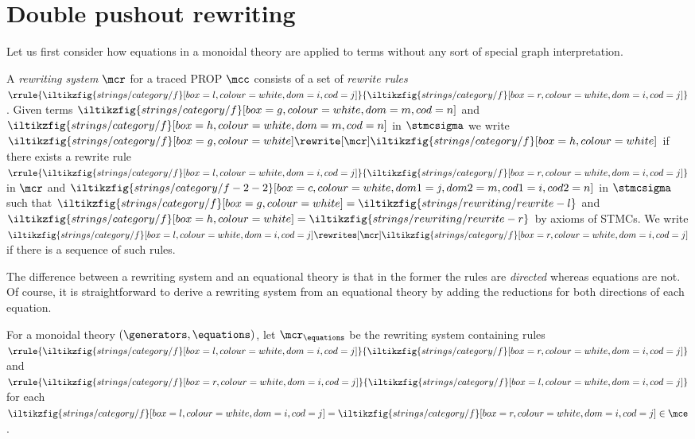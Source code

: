 \section{Double pushout rewriting}

Let us first consider how equations in a monoidal theory are
applied to terms without any sort of special graph interpretation.


\begin{definition}\label{def:term-rewriting}
    A \emph{rewriting system} \(\mcr\) for a traced PROP \(\mcc\)
    consists of a set of \emph{rewrite rules} \(
    \rrule{
        \iltikzfig{strings/category/f}[box=l,colour=white,dom=i,cod=j]
    }{
        \iltikzfig{strings/category/f}[box=r,colour=white,dom=i,cod=j]
    }
    \).
    Given terms \(
    \iltikzfig{strings/category/f}[box=g,colour=white,dom=m,cod=n]
    \) and \(
    \iltikzfig{strings/category/f}[box=h,colour=white,dom=m,cod=n]
    \) in \(\stmcsigma\) we write \(
    \iltikzfig{strings/category/f}[box=g,colour=white]
    \rewrite[\mcr]
    \iltikzfig{strings/category/f}[box=h,colour=white]
    \) if there exists a rewrite rule \(\rrule{
        \iltikzfig{strings/category/f}[box=l,colour=white,dom=i,cod=j]
    }{
        \iltikzfig{strings/category/f}[box=r,colour=white,dom=i,cod=j]
    }\) in \(\mcr\) and \(
    \iltikzfig{strings/category/f-2-2}[box=c,colour=white,dom1=j,dom2=m,cod1=i,cod2=n]
    \) in \(\stmcsigma\) such that \(
    \iltikzfig{strings/category/f}[box=g,colour=white]
    =
    \iltikzfig{strings/rewriting/rewrite-l}
    \) and \(
    \iltikzfig{strings/category/f}[box=h,colour=white]
    =
    \iltikzfig{strings/rewriting/rewrite-r}
    \) by axioms of STMCs.
    We write \(
    \iltikzfig{strings/category/f}[box=l,colour=white,dom=i,cod=j]
    \rewrites[\mcr]
    \iltikzfig{strings/category/f}[box=r,colour=white,dom=i,cod=j]
    \) if there is a sequence of such rules.
\end{definition}

The difference between a rewriting system and an equational theory is that in
the former the rules are \emph{directed} whereas equations are not.
Of course, it is straightforward to derive a rewriting system from an equational
theory by adding the reductions for both directions of each equation.

\begin{definition}
    For a monoidal theory \((\generators,\equations)\), let
    \(\mcr_{\equations}\) be the rewriting system containing rules
    \(\rrule{
        \iltikzfig{strings/category/f}[box=l,colour=white,dom=i,cod=j]
    }{
        \iltikzfig{strings/category/f}[box=r,colour=white,dom=i,cod=j]
    }\) and \(
    \rrule{
        \iltikzfig{strings/category/f}[box=r,colour=white,dom=i,cod=j]
    }{
        \iltikzfig{strings/category/f}[box=l,colour=white,dom=i,cod=j]
    }\) for each \(
    \iltikzfig{strings/category/f}[box=l,colour=white,dom=i,cod=j]
    =
    \iltikzfig{strings/category/f}[box=r,colour=white,dom=i,cod=j]
    \in
    \mce
    \).
\end{definition}


